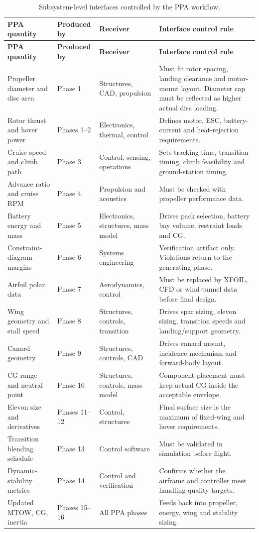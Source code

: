 \begin{longtable}{@{}p{}p{}p{}p{}@{}}
\caption{Subsystem-level interfaces controlled by the PPA workflow.}
\label{tab:ppa_system_interfaces}\\
\toprule
\textbf{PPA quantity} & \textbf{Produced by} & \textbf{Receiver} & \textbf{Interface control rule} \\
\midrule
\endfirsthead
\toprule
\textbf{PPA quantity} & \textbf{Produced by} & \textbf{Receiver} & \textbf{Interface control rule} \\
\midrule
\endhead
\bottomrule
\endfoot
Propeller diameter and disc area & Phase 1 & Structures, CAD, propulsion & Must fit rotor spacing, landing clearance and motor-mount layout. Diameter cap must be reflected as higher actual disc loading. \\
Rotor thrust and hover power & Phases 1--2 & Electronics, thermal, control & Defines motor, ESC, battery-current and heat-rejection requirements. \\
Cruise speed and climb path & Phase 3 & Control, sensing, operations & Sets tracking time, transition timing, climb feasibility and ground-station timing. \\
Advance ratio and cruise RPM & Phase 4 & Propulsion and acoustics & Must be checked with propeller performance data. \\
Battery energy and mass & Phase 5 & Electronics, structures, mass model & Drives pack selection, battery bay volume, restraint loads and CG. \\
Constraint-diagram margins & Phase 6 & Systems engineering & Verification artifact only. Violations return to the generating phase. \\
Airfoil polar data & Phase 7 & Aerodynamics, control & Must be replaced by XFOIL, CFD or wind-tunnel data before final design. \\
Wing geometry and stall speed & Phase 8 & Structures, controls, transition & Drives spar sizing, elevon sizing, transition speeds and landing/support geometry. \\
Canard geometry & Phase 9 & Structures, controls, CAD & Drives canard mount, incidence mechanism and forward-body layout. \\
CG range and neutral point & Phase 10 & Structures, controls, mass model & Component placement must keep actual CG inside the acceptable envelope. \\
Elevon size and derivatives & Phases 11--12 & Control, structures & Final surface size is the maximum of fixed-wing and hover requirements. \\
Transition blending schedule & Phase 13 & Control software & Must be validated in simulation before flight. \\
Dynamic-stability metrics & Phase 14 & Control and verification & Confirms whether the airframe and controller meet handling-quality targets. \\
Updated MTOW, CG, inertia & Phases 15--16 & All PPA phases & Feeds back into propeller, energy, wing and stability sizing. \\
\end{longtable}

